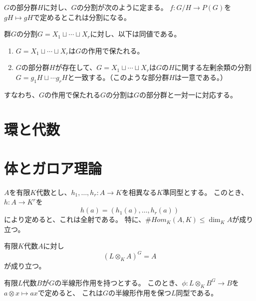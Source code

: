 \begin{proposition}
    \label{subgroup-decomp}
    $G$の部分群$H$に対し、$G$の分割が次のように定まる。
    $f:G/H\to P(G)$を$gH\mapsto gH$で定めるとこれは分割になる。
\end{proposition}

\begin{proposition}\label{group-decomp}
    群$G$の分割$G=X_1\sqcup\cdots\sqcup X_r$に対し、以下は同値である。
    \begin{enumerate}
        \item $G=X_1\sqcup\cdots\sqcup X_r$は$G$の作用で保たれる。
        \item $G$の部分群$H$が存在して、$G=X_1\sqcup\cdots\sqcup X_r$は$G$の$H$に関する左剰余類の分割$G=g_1H\sqcup\cdots g_rH$と一致する。（このような部分群$H$は一意である。）
    \end{enumerate}
    すなわち、$G$の作用で保たれる$G$の分割は$G$の部分群と一対一に対応する。
\end{proposition}

\chapter{環と代数}

\chapter{体とガロア理論}

\begin{proposition}\label{alg-hom}
    $A$を有限$K$代数とし、$h_1,\ldots,h_r:A\to K$を相異なる$K$準同型とする。
    このとき、$h:A\to K^r$を
    $$
    h(a)=(h_1(a),\ldots,h_r(a))
    $$
    により定めると、これは全射である。
    特に、$\# Hom_K(A,K)\leq\dim_KA$が成り立つ。
\end{proposition}

\begin{theorem}\label{Galois-descent1}
    有限$K$代数$A$に対し
    $$
    (L\otimes_K A)^G=A
    $$
    が成り立つ。
\end{theorem}

\begin{theorem}\label{Galois-descent2}
    有限$L$代数$B$が$G$の半線形作用を持つとする。
    このとき、$\phi:L\otimes_KB^G\to B$を$a\otimes x\mapsto ax$で定めると、
    これは$G$の半線形作用を保つ$L$同型である。
\end{theorem}

